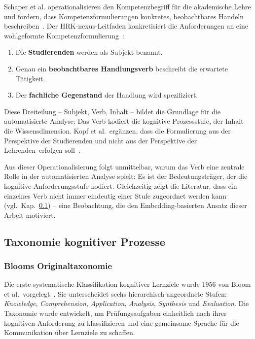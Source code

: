Schaper et al. operationalisieren den Kompetenzbegriff für die akademische Lehre und fordern, dass Kompetenzformulierungen konkretes, beobachtbares Handeln beschreiben~\cite{schaper2012fachgutachten}.
Der HRK-nexus-Leitfaden konkretisiert die Anforderungen an eine wohlgeformte Kompetenzformulierung~\cite{hrknexus2015lernergebnisse}:

\begin{enumerate}
    \item Die \textbf{Studierenden} werden als Subjekt benannt.
    \item Genau ein \textbf{beobachtbares Handlungsverb} beschreibt die erwartete Tätigkeit.
    \item Der \textbf{fachliche Gegenstand} der Handlung wird spezifiziert.
\end{enumerate}

Diese Dreiteilung -- Subjekt, Verb, Inhalt -- bildet die Grundlage für die automatisierte Analyse: Das Verb kodiert die kognitive Prozessstufe, der Inhalt die Wissensdimension.
Kopf et al.\ ergänzen, dass die Formulierung \glqq aus der Perspektive der Studierenden und nicht aus der Perspektive der Lehrenden\grqq\ erfolgen soll~\cite{kopf2010kompetenzen}.

Aus dieser Operationalisierung folgt unmittelbar, warum das Verb eine zentrale Rolle in der automatisierten Analyse spielt: Es ist der Bedeutungsträger, der die kognitive Anforderungsstufe kodiert.
Gleichzeitig zeigt die Literatur, dass ein einzelnes Verb nicht immer eindeutig einer Stufe zugeordnet werden kann (vgl.\ Kap.~\ref{sec:grundlagen-taxonomie}) -- eine Beobachtung, die den Embedding-basierten Ansatz dieser Arbeit motiviert.

%
\subsection{Taxonomie kognitiver Prozesse}\label{sec:grundlagen-taxonomie}

\subsubsection{Blooms Originaltaxonomie}

Die erste systematische Klassifikation kognitiver Lernziele wurde 1956 von Bloom et al.\ vorgelegt~\cite{bloom1956taxonomy}.
Sie unterscheidet sechs hierarchisch angeordnete Stufen: \emph{Knowledge}, \emph{Comprehension}, \emph{Application}, \emph{Analysis}, \emph{Synthesis} und \emph{Evaluation}.
Die Taxonomie wurde entwickelt, um Prüfungsaufgaben einheitlich nach ihrer kognitiven Anforderung zu klassifizieren und eine gemeinsame Sprache für die Kommunikation über Lernziele zu schaffen.

